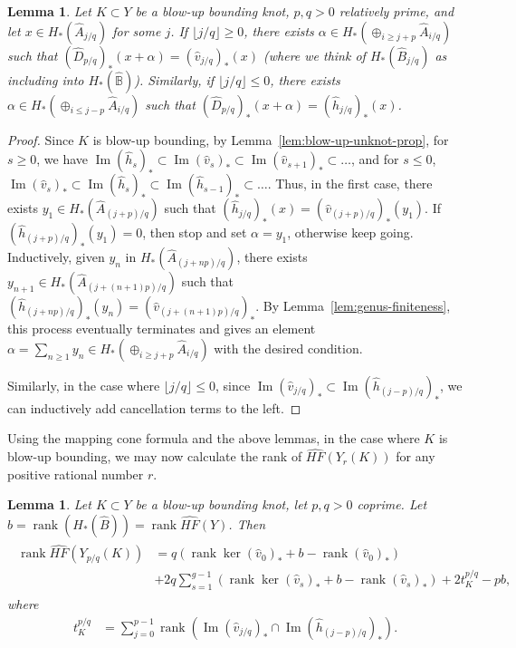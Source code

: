 \documentclass{article}
\newtheorem{lemma}[equation]{Lemma}
\theoremstyle{remark}
\numberwithin{equation}{section}
\numberwithin{table}{section}
\newcommand{\wh}{\widehat}
\DeclareMathOperator{\im}{Im}
\DeclareMathOperator{\rank}{rank}
\renewcommand{\(}{\left(}
\renewcommand{\)}{\right)}
\newcommand{\B}{{\mathbb{B}}}
\begin{document}
\begin{lemma}\label{lem:cancellation-general}
Let $K\subset Y$ be a blow-up bounding knot, $p,q>0$ relatively prime, and let $x\in H_*(\wh A_{j/q})$ for some $j$. If $\lfloor j/q\rfloor\ge 0$, there exists $\alpha\in H_*(\oplus_{i\ge j+p}\wh A_{i/q})$ such that $(\wh D_{p/q})_*(x+\alpha)=(\wh v_{j/q})_*(x)$ (where we think of $H_*(\wh B_{j/q})$ as including into $H_*(\wh\B)$). Similarly, if $\lfloor j/q\rfloor\le 0$, there exists $\alpha\in H_*(\oplus_{i\le j-p}\wh A_{i/q})$ such that $(\wh D_{p/q})_*(x+\alpha)=(\wh h_{j/q})_*(x)$.
\end{lemma}
\begin{proof}
Since $K$ is blow-up bounding, by Lemma~\ref{lem:blow-up-unknot-prop}, for $s\ge 0$, we have $\im(\wh h_s)_*\subset\im(\wh v_s)_*\subset\im(\wh v_{s+1})_*\subset\dots$, and for $s\le 0$, $\im(\wh v_s)_*\subset\im(\wh h_s)_*\subset\im(\wh h_{s-1})_*\subset\dots$. Thus, in the first case, there exists $y_1\in H_*(\wh A_{(j+p)/q})$ such that $(\wh h_{j/q})_*(x)=(\wh v_{(j+p)/q})_*(y_1)$. If $(\wh h_{(j+p)/q})_*(y_1)=0$, then stop and set $\alpha=y_1$, otherwise keep going. Inductively, given $y_n$ in $H_*(\wh A_{(j+np)/q})$, there exists $y_{n+1}\in H_*(\wh A_{(j+(n+1)p)/q})$ such that $(\wh h_{(j+np)/q})_*(y_n)=(\wh v_{(j+(n+1)p)/q})_*$. By Lemma~\ref{lem:genus-finiteness}, this process eventually terminates and gives an element $\alpha=\sum_{n\ge 1}y_n\in H_*(\oplus_{i\ge j+p}\wh A_{i/q})$ with the desired condition.

Similarly, in the case where $\lfloor j/q\rfloor\le 0$, since $\im(\wh v_{j/q})_*\subset\im(\wh h_{(j-p)/q})_*$, we can inductively add cancellation terms to the left. 
\end{proof}




Using the mapping cone formula and the above lemmas, in the case where $K$ is blow-up bounding, we may now calculate the rank of $\wh{HF}(Y_r(K))$ for any positive rational number $r$.

\begin{lemma}
Let $K\subset Y$ be a blow-up bounding knot, let $p,q>0$ coprime. Let $b=\rank(H_*(\wh B))=\rank\wh{HF}(Y)$. Then
\begin{align}\label{eq:rank-formula-pos-general}
\begin{split}
    \rank \wh{HF}(Y_{p/q}(K)) &= q(\rank\ker(\wh v_0)_*+b-\rank(\wh v_0)_*) \\
    &+2q\sum_{s=1}^{g-1}(\rank\ker(\wh v_s)_*+b-\rank(\wh v_s)_*)+ 2t_K^{p/q}-pb,
\end{split}
\end{align}
where
\begin{align}
    t_K^{p/q} &= \sum_{j=0}^{p-1} \rank\left(\im(\wh v_{j/q})_* \cap \im(\wh h_{(j-p)/q})_*\right).
\end{align}
\end{lemma}
\end{document}
